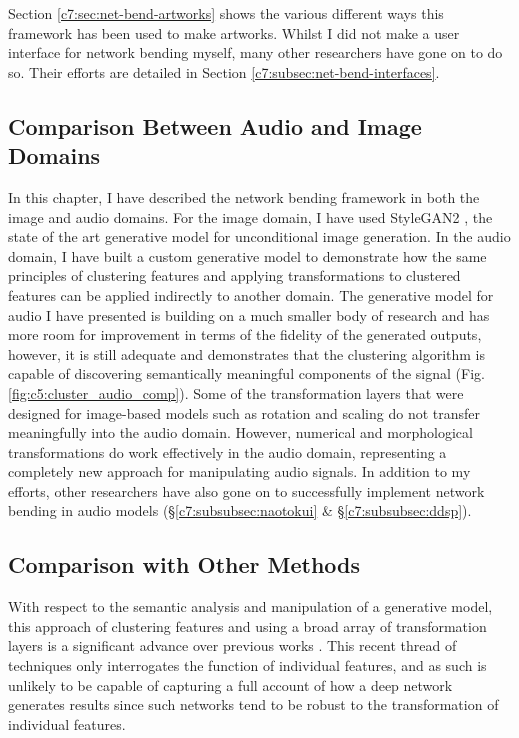 Section \ref{c7:sec:net-bend-artworks} shows the various different ways this framework has been used to make artworks.
Whilst I did not make a user interface for network bending myself, many other researchers have gone on to do so.
Their efforts are detailed in Section \ref{c7:subsec:net-bend-interfaces}.

\subsection{Comparison Between Audio and Image Domains}

In this chapter, I have described the network bending framework in both the image and audio domains. 
For the image domain, I have used StyleGAN2 \citep{karras2019analyzing}, the state of the art generative model for unconditional image generation. In the audio domain, I have built a custom generative model to demonstrate how the same principles of clustering features and applying transformations to clustered features can be applied indirectly to another domain. 
The generative model for audio I have presented is building on a much smaller body of research and has more room for improvement in terms of the fidelity of the generated outputs, however, it is still adequate and demonstrates that the clustering algorithm is capable of discovering semantically meaningful components of the signal  (Fig. \ref{fig:c5:cluster_audio_comp}). 
Some of the transformation layers that were designed for image-based models such as rotation and scaling do not transfer meaningfully into the audio domain. 
However, numerical and morphological transformations do work effectively in the audio domain, representing a completely new approach for manipulating audio signals. 
In addition to my efforts, other researchers have also gone on to successfully implement network bending in audio models (\S \ref{c7:subsubsec:naotokui} \& \S \ref{c7:subsubsec:ddsp}).

\subsection{Comparison with Other Methods}

With respect to the semantic analysis and manipulation of a generative model, this approach of clustering features and using a broad array of transformation layers is a significant advance over previous works \citep{Bau2017-vg,Bau2018-td,bau2019semantic, Brink2019-gc}. 
This recent thread of techniques only interrogates the function of individual features, and as such is unlikely to be capable of capturing a full account of how a deep network generates results since such networks tend to be robust to the transformation of individual features. 

